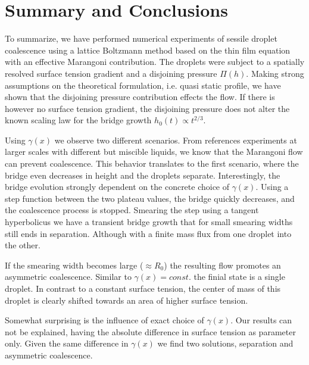 \documentclass[twocolumn,amsmath,amssymb,showpacs,pre,nofootinbib,superscriptaddress]{revtex4-1} %
\begin{document}
\section{Summary and Conclusions}\label{sec:sum_conclu}

To summarize, we have performed numerical experiments of sessile droplet coalescence using a lattice Boltzmann method based on the thin film equation with an effective Marangoni contribution.
The droplets were subject to a spatially resolved surface tension gradient and a disjoining pressure $\Pi(h)$.
Making strong assumptions on the theoretical formulation, i.e. quasi static profile, we have shown that the disjoining pressure contribution effects the flow.
If there is however no surface tension gradient, the disjoining pressure does not alter the known scaling law for the bridge growth $h_0(t) \propto t^{2/3}$.

Using $\gamma(x)$ we observe two different scenarios.
From references experiments at larger scales with different but miscible liquids, we know that the Marangoni flow can prevent coalescence.
This behavior translates to the first scenario, where the bridge even decreases in height and the droplets separate.
Interestingly, the bridge evolution strongly dependent on the concrete choice of $\gamma(x)$.
Using a step function between the two plateau values, the bridge quickly decreases, and the coalescence process is stopped.
Smearing the step using a tangent hyperbolicus we have a transient bridge growth that for small smearing widths still ends in separation.
Although with a finite mass flux from one droplet into the other.

If the smearing width becomes large ($\approx R_0$) the resulting flow promotes an asymmetric coalescence.
Similar to $\gamma(x) = const.$ the finial state is a single droplet.
In contrast to a constant surface tension, the center of mass of this droplet is clearly shifted towards an area of higher surface tension.

Somewhat surprising is the influence of exact choice of $\gamma(x)$.
Our results can not be explained, having the absolute difference in surface tension as parameter only.
Given the same difference in $\gamma(x)$ we find two solutions, separation and asymmetric coalescence.
\end{document}
